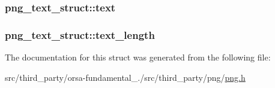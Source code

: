 \subsubsection[{text}]{ png\+\_\+text\+\_\+struct\+::text}\label{structpng__text__struct_a27492227bc525bee14abcc8002084edd}
\hypertarget{structpng__text__struct_a26312284ecc7a95e2168a29d0170b411}{}
\subsubsection[{text\+\_\+length}]{ png\+\_\+text\+\_\+struct\+::text\+\_\+length}\label{structpng__text__struct_a26312284ecc7a95e2168a29d0170b411}


The documentation for this struct was generated from the following file\+:\begin{DoxyCompactItemize}
\item 
src/third\+\_\+party/orsa-\/fundamental\+\_./src/third\+\_\+party/png/\hyperlink{png_8h}{png.\+h}\end{DoxyCompactItemize}
